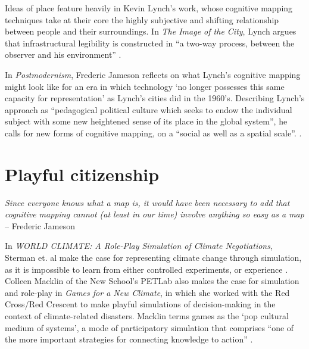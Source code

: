 \documentclass[nofonts,nols,justified,nobib]{tufte-book}
\begin{document}
Ideas of place feature heavily in Kevin Lynch's work, whose cognitive mapping techniques take at their core the highly subjective and shifting relationship between people and their surroundings. In \emph{The Image of the City}, Lynch argues that infrastructural legibility is constructed in ``a two-way process, between the observer and his environment'' \cite{lynch_image_1960}.

In \emph{Postmodernism}, Frederic Jameson reflects on what Lynch's cognitive mapping might look like for an era in which technology `no longer possesses this same capacity for representation' as Lynch's cities did in the 1960's. Describing Lynch's approach as ``pedagogical political culture which seeks to endow the individual subject with some new heightened sense of its place in the global system'', he calls for new forms of cognitive mapping, on a ``social as well as a spatial scale''. \cite{jameson_postmodernism_1991}.


\newpage

\section*{Playful citizenship}

\begin{flushright}
\emph{Since everyone knows what a map is, it would have been necessary to add that cognitive mapping cannot (at least in our time) involve anything so easy as a map}\cite{jameson_postmodernism_1991} \\
-- Frederic Jameson
\end{flushright}

In \emph{WORLD CLIMATE: A Role-Play Simulation of Climate Negotiations}, Sterman et. al make the case for representing climate change through simulation, as it is impossible to learn from either controlled experiments, or experience \cite{sterman_world_2015}. Colleen Macklin of the New School's PETLab also makes the case for simulation and role-play in \emph{Games for a New Climate}, in which she worked with the Red Cross/Red Crescent to make playful simulations of decision-making in the context of climate-related disasters. Macklin terms games as the `pop cultural medium of systems', a mode of participatory simulation that comprises ``one of the more important strategies for connecting knowledge to action'' \cite{macklin_games_2013}.
\end{document}
